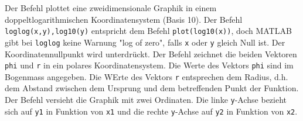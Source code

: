 \newline\newline
Der Befehl  plottet eine zweidimensionale Graphik in einem doppeltlogarithmischen Koordinatensystem (Basis 10). Der Befehl {\color{red}\texttt{loglog(x,y),log10(y)}} entspricht dem Befehl {\color{red}\texttt{plot(log10(x))}}, doch MATLAB gibt bei \texttt{loglog} keine Warnung "log of zero", falls \texttt{x} oder \texttt{y} gleich Null ist. Der Koordinatennullpunkt wird unterdrückt.  
\newline\newline
Der Befehl  zeichnet die beiden Vektoren \texttt{phi} und \texttt{r} in ein polares Koordinatensystem. Die Werte des Vektors \texttt{phi} sind im Bogenmass angegeben. Die WErte des Vektors \texttt{r} entsprechen dem Radius, d.h. dem Abstand zwischen dem Ursprung und dem betreffenden Punkt der Funktion.
\newline\newline
Der Befehl  versieht die Graphik mit zwei Ordinaten. Die linke \texttt{y}-Achse bezieht sich auf \texttt{y1} in Funktion von \texttt{x1} und die rechte \texttt{y}-Achse auf \texttt{y2} in Funktion von \texttt{x2}.

